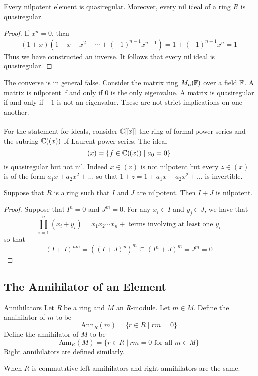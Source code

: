 \documentclass[a4paper]{article}
\begin{document}
\begin{lmm}{}{} Every nilpotent element is quasiregular. Moreover, every nil ideal of a ring $R$ is quasiregular. \tcbline
\begin{proof}
If $x^n=0$, then $$(1+x)(1-x+x^2-\cdots+(-1)^{n-1}x^{n-1})=1+(-1)^{n-1}x^n=1$$ Thus we have constructed an inverse. It follows that every nil ideal is quasiregular. 
\end{proof}
\end{lmm}

The converse is in general false. Consider the matrix ring $M_n(\mathbb{F})$ over a field $\mathbb{F}$. A matrix is nilpotent if and only if $0$ is the only eigenvalue. A matrix is quasiregular if and only if $-1$ is not an eigenvalue. These are not strict implications on one another. \\~\\

For the statement for ideals, consider $\mathbb{C}[[x]]$ the ring of formal power series and the subring $\mathbb{C}((x))$ of Laurent power series. The ideal $$(x)=\{f\in\mathbb{C}((x))\;|\;a_0=0\}$$ is quasiregular but not nil. Indeed $x\in(x)$ is not nilpotent but every $z\in(x)$ is of the form $a_1x+a_2x^2+\dots$ so that $1+z=1+a_1x+a_2x^2+\dots$ is invertible. 

\begin{prp}{}{} Suppose that $R$ is a ring such that $I$ and $J$ are nilpotent. Then $I+J$ is nilpotent. \tcbline
\begin{proof}
Suppose that $I^n=0$ and $J^m=0$. For any $x_i\in I$ and $y_j\in J$, we have that $$\prod_{i=1}^n(x_i+y_i)=x_1x_2\cdots x_n+\text{ terms involving at least one }y_i$$ so that $$(I+J)^{nm}=((I+J)^n)^m\subseteq(I^n+J)^m=J^m=0$$
\end{proof}
\end{prp}

\subsection{The Annihilator of an Element}
\begin{defn}{Annihilators}{} Let $R$ be a ring and $M$ an $R$-module. Let $m\in M$. Define the annihilator of $m$ to be $$\text{Ann}_R(m)=\{r\in R\;|\;rm=0\}$$ Define the annihilator of $M$ to be $$\text{Ann}_R(M)=\{r\in R\;|\;rm=0\text{ for all }m\in M\}$$ Right annihilators are defined similarly. 
\end{defn}

When $R$ is commutative left annihilators and right annihilators are the same. 
\end{document}
